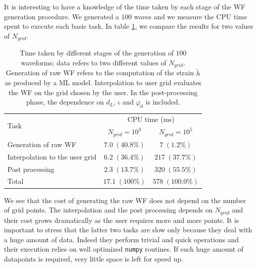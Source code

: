 It is interesting to have a knowledge of the time taken by each stage of the WF generation procedure.
We generated a $100$ waves and we measure the CPU time spent to execute each basic task.
In table \ref{tab:profiling}, we compare the results for two values of $N_{grid}$.
\begin{table}
	\begin{tabular}{ l c c }
		\multirow{2}{*}{Task}& \multicolumn{2}{c}{CPU time (ms)}\\
			&$N_{grid} = 10^3$	& $N_{grid} = 10^5$\\
	\hline \hline
		 Generation of raw WF 			& $7.0 \; (40.8\%)$	& $7 \; (1.2\%)$ \\ 
	\hline
		 Interpolation to the user grid & $6.2 \; (36.4\%)$	& $217 \; (37.7\%)$ \\ 
	\hline
		 Post processing 				& $2.3 \; (13.7\%)$	& $320 \; (55.5\%)$ \\
	\hline
		 Total							& $17.1 \; (100\%)$ &  $578 \; (100.0\%)$ \\
	\hline \hline
	\end{tabular}
	\caption{
Time taken by different stages of the generation of $100$ waveforms; data refers to two different values of $N_{grid}$.
Generation of raw WF refers to the computation of the strain $\tilde{h}$ as produced by a ML model. Interpolation to user grid evaluates the WF on the grid chosen by the user. In the post-processing phase, the dependence on $d_L$, $\iota$ and $\varphi_0$ is included.
}
	\label{tab:profiling}
\end{table}
\par
We see that the cost of generating the raw WF does not depend on the number of grid points. The interpolation and the post processing depends on $N_{grid}$ and their cost grows dramatically as the user requires more and more points.
It is important to stress that the latter two tasks are slow only because they deal with a huge amount of data. Indeed they perform trivial and quick operations and their execution relies on well optimized \texttt{numpy} routines.
If such huge amount of datapoints is required, very little space is left for speed up.
\par

